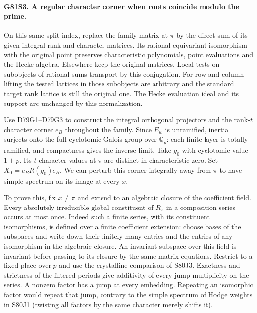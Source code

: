 \paragraph{G81S3. A regular character corner when roots coincide modulo the prime.}
On this same split index, replace the family matrix at $\pi$ by
the direct sum of its given integral rank and character matrices.
Its rational equivariant isomorphism with the original point
preserves characteristic polynomials, point evaluations and the
Hecke algebra. Elsewhere keep the original matrices. Local tests
on subobjects of rational sums transport by this conjugation.
For row and column lifting the tested lattices in those subobjects
are arbitrary and the standard target rank lattice is still the
original one. The Hecke evaluation ideal and its support are
unchanged by this normalization.

Use D79G1--D79G3 to construct the integral orthogonal projectors
and the rank-$t$ character corner $e_B$ throughout the family.
Since $E_w$ is unramified, inertia surjects onto the full
cyclotomic Galois group over $\mathbb Q_p$: each finite layer
is totally ramified, and compactness gives the inverse limit.
Take $g_0$ with cyclotomic value $1+p$. Its $t$ character
values at $\pi$ are distinct in characteristic zero. Set
$X_0=e_BR(g_0)e_B$. We can perturb this corner integrally away
from $\pi$ to have simple spectrum on its image at every $x$.

To prove this, fix $x\ne\pi$ and extend to an algebraic closure
of the coefficient field. Every absolutely irreducible global
constituent of $R_x$ in a composition series occurs at most once.
Indeed such a finite series, with its constituent isomorphisms,
is defined over a finite coefficient extension: choose bases of
the subspaces and write down their finitely many entries and the
entries of any isomorphism in the algebraic closure. An invariant
subspace over this field is invariant before passing to its
closure by the same matrix equations. Restrict to a fixed place
over $p$ and use the crystalline comparison of S80J3. Exactness
and strictness of the filtered periods give additivity of every
jump multiplicity on the series. A nonzero factor has a jump at
every embedding. Repeating an isomorphic factor would repeat that
jump, contrary to the simple spectrum of Hodge weights in S80J1
(twisting all factors by the same character merely shifts it).

